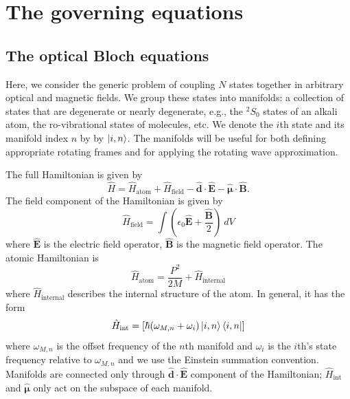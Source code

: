 \documentclass[final,5p,times,twocolumn]{elsarticle}
\begin{document}
\section{The governing equations}
\label{sec:governing_equations}
\subsection{The optical Bloch equations}
Here, we consider the generic problem of coupling $N$ states together in arbitrary optical and magnetic fields.
We group these states into manifolds: a collection of states that are degenerate or nearly degenerate, e.g., the $^2S_0$ states of an alkali atom, the ro-vibrational states of molecules, etc.
We denote the $i$th state and its manifold index $n$ by by $\ket{i, n}$.
The manifolds will be useful for both defining appropriate rotating frames and for applying the rotating wave approximation.

The full Hamiltonian is given by
\begin{equation}
    \label{eq:obe:generic_hamiltonian}
    \hat{H} = \hat{H}_\text{atom} + \hat{H}_\text{field} -
    \hat{\boldsymbol{d}}\cdot\hat{\mathbf{E}} -
    \hat{\boldsymbol{\mu}}\cdot\hat{\mathbf{B}}.
\end{equation}
The field component of the Hamiltonian is given by
\begin{equation}
    \label{eq:obe:field}
    \hat{H}_\text{field} = \int \left(\epsilon_0 \hat{\mathbf{E}} +
    \frac{\hat{\mathbf{B}}}{2}\right)\ dV
\end{equation}
where $\hat{\mathbf{E}}$ is the electric field operator, $\hat{\mathbf{B}}$ is the magnetic field operator.
The atomic Hamiltonian is 
\begin{equation}
    \hat{H}_\text{atom} = \frac{P^2}{2M} + \hat{H}_\text{internal}
\end{equation}
where $\hat{H}_\text{internal}$ describes the internal structure of the atom.
In general, it has the form
\begin{equation}
	\hat{H}_\text{int} = \left[\hbar(\omega_{M,n} + \omega_i)\ket{i,n}\Bra{i, n}\right]
\end{equation}
where $\omega_{M,n}$ is the offset frequency of the $n$th manifold and $\omega_i$ is the $i$th's state frequency relative to $\omega_{M,n}$ and we use the Einstein summation convention.  Manifolds are connected only through $\hat{\mathbf{d}}\cdot\hat{\mathbf{E}}$ component of the Hamiltonian; $\hat{H}_\text{int}$ and $\hat{\boldsymbol{\mu}}$ only act on the subspace of each manifold.
\end{document}
